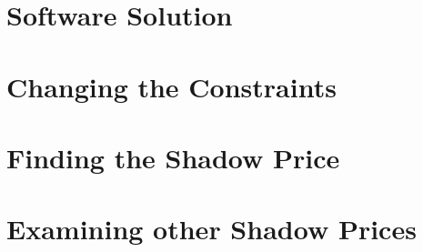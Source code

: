 \documentclass{article}
\begin{document}
\section{Software Solution}

\section{Changing the Constraints}

\section{Finding the Shadow Price}

\section{Examining other Shadow Prices}
\end{document}
